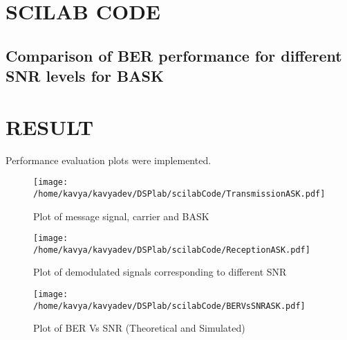 \section{SCILAB CODE}

\subsection*{Comparison of BER performance for different SNR levels for BASK}




\section{RESULT}
Performance evaluation plots were implemented.

\begin{figure}
\texttt{[image: /home/kavya/kavyadev/DSPlab/scilabCode/TransmissionASK.pdf]}
\caption{Plot of message signal, carrier and BASK}
\label{transmissionask}
\end{figure}


\begin{figure}
\texttt{[image: /home/kavya/kavyadev/DSPlab/scilabCode/ReceptionASK.pdf]}
\caption{Plot of demodulated signals corresponding to different SNR}
\label{receptionask}
\end{figure}


\begin{figure}
\texttt{[image: /home/kavya/kavyadev/DSPlab/scilabCode/BERVsSNRASK.pdf]}
\caption{Plot of BER Vs SNR (Theoretical and Simulated)}
\label{BER Vs SNR}
\end{figure}
